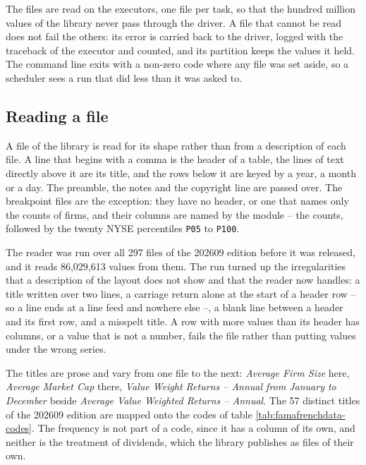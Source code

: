 The files are read on the executors, one file per task, so that the hundred million values of the library never pass through the driver. A file that cannot be read does not fail the others: its error is carried back to the driver, logged with the traceback of the executor and counted, and its partition keeps the values it held. The command line exits with a non-zero code where any file was set aside, so a scheduler sees a run that did less than it was asked to.

\subsection{Reading a file}

A file of the library is read for its shape rather than from a description of each file. A line that begins with a comma is the header of a table, the lines of text directly above it are its title, and the rows below it are keyed by a year, a month or a day. The preamble, the notes and the copyright line are passed over. The breakpoint files are the exception: they have no header, or one that names only the counts of firms, and their columns are named by the module -- the counts, followed by the twenty NYSE percentiles \verb|P05| to \verb|P100|.

The reader was run over all 297 files of the 202609 edition before it was released, and it reads 86{,}029{,}613 values from them. The run turned up the irregularities that a description of the layout does not show and that the reader now handles: a title written over two lines, a carriage return alone at the start of a header row -- so a line ends at a line feed and nowhere else --, a blank line between a header and its first row, and a misspelt title. A row with more values than its header has columns, or a value that is not a number, fails the file rather than putting values under the wrong series.

The titles are prose and vary from one file to the next: \emph{Average Firm Size} here, \emph{Average Market Cap} there, \emph{Value Weight Returns -- Annual from January to December} beside \emph{Average Value Weighted Returns -- Annual}. The 57 distinct titles of the 202609 edition are mapped onto the codes of table \ref{tab:famafrenchdata-codes}. The frequency is not part of a code, since it has a column of its own, and neither is the treatment of dividends, which the library publishes as files of their own.


